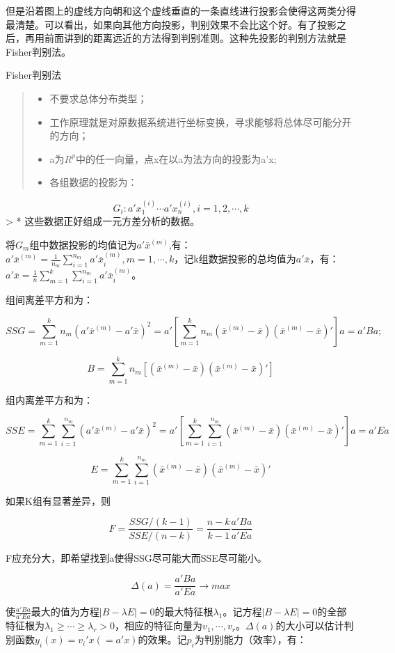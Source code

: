 \documentclass[]{ctexbook}
\providecommand{\tightlist}{%
  \setlength{\itemsep}{0pt}\setlength{\parskip}{0pt}}
\begin{document}
但是沿着图上的虚线方向朝和这个虚线垂直的一条直线进行投影会使得这两类分得最清楚。可以看出，如果向其他方向投影，判别效果不会比这个好。有了投影之后，再用前面讲到的距离远近的方法得到判别准则。这种先投影的判别方法就是Fisher判别法。

Fisher判别法

\begin{quote}
\begin{itemize}
\tightlist
\item
  不要求总体分布类型；
\item
  工作原理就是对原数据系统进行坐标变换，寻求能够将总体尽可能分开的方向；
\item
  a为\(R^p\)中的任一向量，点x在以a为法方向的投影为a'x;
\item
  各组数据的投影为：
\end{itemize}
\end{quote}

\[G_i:a'x_1^{(i)}\cdots a'x_n^{(i)},i=1,2,\cdots,k\]
\textgreater{} * 这些数据正好组成一元方差分析的数据。

将\(G_m\)组中数据投影的均值记为\(a'\bar x^{(m)}\),有：\(a'\bar x^{(m)}=\frac{1}{n_m}\sum_{i=1}^{n_m}a'\bar x_i^{(m)} ,m=1,\cdots,k\)，记k组数据投影的总均值为\(a'\bar x\)，有：\(a'\bar x=\frac{1}{n}\sum_{m=1}^{k}\sum_{i=1}^{n_m}a'\bar x_i^{(m)}\)。

组间离差平方和为：

\[SSG=\sum_{m=1}^{k}n_m(a'\bar x^{(m)}-a'\bar x)^2=a'[\sum_{m=1}^{k}n_m(\bar x^{(m)}-\bar x)(\bar x^{(m)}-\bar x)']a=a'Ba;\]

\[B=\sum_{m=1}^{k}n_m[(\bar x^{(m)}-\bar x)(\bar x^{(m)}-\bar x)']\]

组内离差平方和为：

\[SSE=\sum_{m=1}^k \sum_{i=1}^{n_m}(a'\bar x^{(m)}-a'\bar x)^2=a'[\sum_{m=1}^k \sum_{i=1}^{n_m}(\bar x^{(m)}-\bar x)(\bar x^{(m)}-\bar x)']a=a'Ea\]

\[E=\sum_{m=1}^k \sum_{i=1}^{n_m}(\bar x^{(m)}-\bar x)(\bar x^{(m)}-\bar x)'\]

如果K组有显著差异，则

\[F=\frac{SSG/(k-1)}{SSE/(n-k)}=\frac{n-k}{k-1}\frac{a'Ba}{a'Ea}\]

F应充分大，即希望找到a使得SSG尽可能大而SSE尽可能小。

\[\Delta (a)=\frac{a'Ba}{a'Ea}\rightarrow max\]

使\(\frac{a'Ba}{a'Ea}\)最大的值为方程\(\left|B-\lambda E\right|=0\)的最大特征根\(\lambda_1\)。记方程\(\left|B-\lambda E\right|=0\)的全部特征根为\(\lambda_1\ge \cdots \ge \lambda_r>0\)，相应的特征向量为\(v_1,\cdots,v_r\)。\(\Delta (a)\)的大小可以估计判别函数\(y_i (x)=v_i'x(=a'x)\)的效果。记\(p_i\)为判别能力（效率），有：
\end{document}
